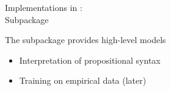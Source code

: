 \documentclass{beamer}
\begin{document}
    \begin{frame}{Implementations in \tnreason: \\
    Subpackage \spapplication{}}

        The subpackage \spapplication{} provides high-level models
        \begin{itemize}
            \item Interpretation of propositional syntax
            \item Training on empirical data (later)
        \end{itemize}

        \begin{center}
        \end{center}

    \end{frame}

%
%
\end{document}
